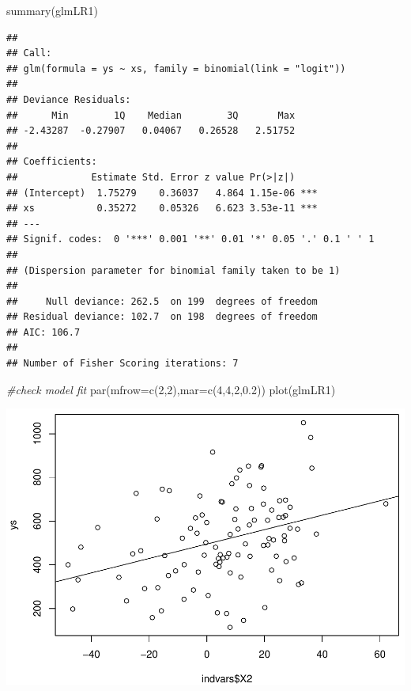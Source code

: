 \documentclass[
]{book}
\newenvironment{Shaded}{\begin{snugshade}}{\end{snugshade}}
\newcommand{\AttributeTok}[1]{\textcolor[rgb]{0.77,0.63,0.00}{#1}}
\newcommand{\CommentTok}[1]{\textcolor[rgb]{0.56,0.35,0.01}{\textit{#1}}}
\newcommand{\DecValTok}[1]{\textcolor[rgb]{0.00,0.00,0.81}{#1}}
\newcommand{\FloatTok}[1]{\textcolor[rgb]{0.00,0.00,0.81}{#1}}
\newcommand{\FunctionTok}[1]{\textcolor[rgb]{0.00,0.00,0.00}{#1}}
\newcommand{\NormalTok}[1]{#1}
\begin{document}
\begin{Shaded}
\begin{Highlighting}[]
\FunctionTok{summary}\NormalTok{(glmLR1)}
\end{Highlighting}
\end{Shaded}

\begin{verbatim}
## 
## Call:
## glm(formula = ys ~ xs, family = binomial(link = "logit"))
## 
## Deviance Residuals: 
##      Min        1Q    Median        3Q       Max  
## -2.43287  -0.27907   0.04067   0.26528   2.51752  
## 
## Coefficients:
##             Estimate Std. Error z value Pr(>|z|)    
## (Intercept)  1.75279    0.36037   4.864 1.15e-06 ***
## xs           0.35272    0.05326   6.623 3.53e-11 ***
## ---
## Signif. codes:  0 '***' 0.001 '**' 0.01 '*' 0.05 '.' 0.1 ' ' 1
## 
## (Dispersion parameter for binomial family taken to be 1)
## 
##     Null deviance: 262.5  on 199  degrees of freedom
## Residual deviance: 102.7  on 198  degrees of freedom
## AIC: 106.7
## 
## Number of Fisher Scoring iterations: 7
\end{verbatim}

\begin{Shaded}
\begin{Highlighting}[]
\CommentTok{\#check model fit}
\FunctionTok{par}\NormalTok{(}\AttributeTok{mfrow=}\FunctionTok{c}\NormalTok{(}\DecValTok{2}\NormalTok{,}\DecValTok{2}\NormalTok{),}\AttributeTok{mar=}\FunctionTok{c}\NormalTok{(}\DecValTok{4}\NormalTok{,}\DecValTok{4}\NormalTok{,}\DecValTok{2}\NormalTok{,}\FloatTok{0.2}\NormalTok{))}
\FunctionTok{plot}\NormalTok{(glmLR1)}
\end{Highlighting}
\end{Shaded}

\includegraphics{ECOMODbook_files/figure-latex/unnamed-chunk-14-2.pdf}
\end{document}
